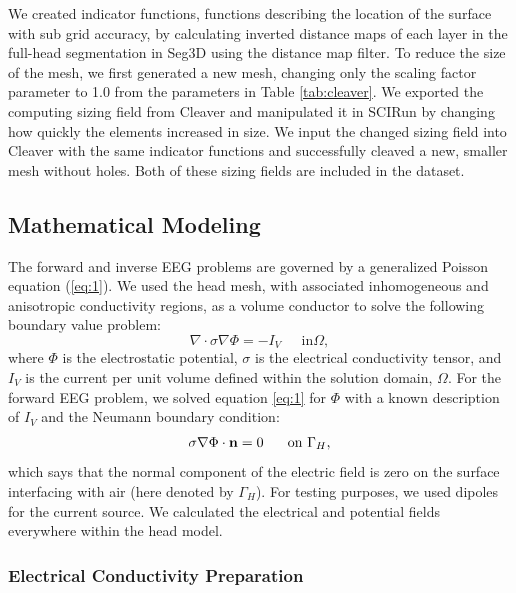 We created indicator functions, functions describing the location of the surface with sub grid accuracy, by calculating inverted distance maps of each layer in the full-head segmentation in Seg3D using the distance map filter. To reduce the size of the mesh, we first generated a new mesh, changing only the scaling factor parameter to 1.0 from the parameters in Table \ref{tab:cleaver}. We exported the computing sizing field from Cleaver and manipulated it in SCIRun by changing how quickly the elements increased in size. We input the changed sizing field into Cleaver with the same indicator functions and successfully cleaved a new, smaller mesh without holes. Both of these sizing fields are included in the dataset.

\subsection{Mathematical Modeling}
\label{sec:math}


The forward and inverse EEG problems are governed by a generalized Poisson equation (\ref{eq:1}). We used the head mesh, with associated inhomogeneous and anisotropic conductivity regions, as a volume conductor to solve the following boundary value problem:
%
\begin{equation}
\label{eq:1} \nabla\cdot\sigma\nabla\Phi = -I_{V} \;\;\;\;\mbox{ in
}\Omega,
\end{equation} 
%
where $\Phi$ is the electrostatic potential, $\sigma$ is the electrical conductivity tensor, and $I_{V}$ is the current per unit volume defined within the solution domain, $\Omega$. For the forward EEG problem, we solved equation \ref{eq:1} for $\Phi$ with a known description of $I_{V}$ and the Neumann boundary condition:
%
\begin{equation} \sigma\nabla\Phi\cdot{\bf
n} = 0\;\;\;\;\;\mbox{ on }\Gamma_{H}, 
\end{equation} 
%
which says that the normal component of the electric field is zero on the surface interfacing with air (here denoted by $\Gamma_{H}$). For testing purposes, we used dipoles for the current source. We calculated the electrical and potential fields everywhere within the head model. \cite{SCI:Joh2015c}

\subsubsection{Electrical Conductivity Preparation}
\label{sec:cond}

